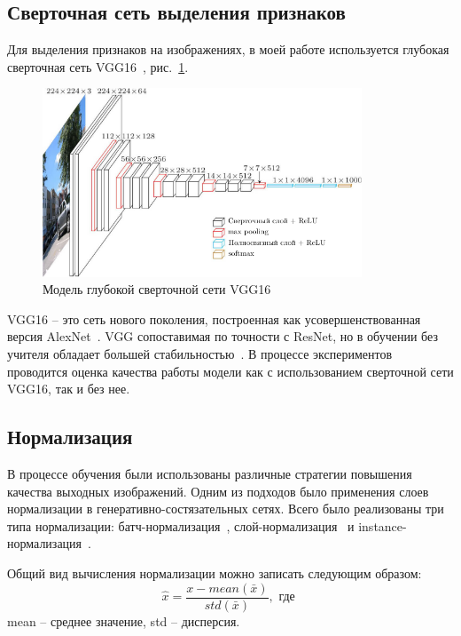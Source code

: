 \documentclass[11pt,a4paper]{extarticle}
\begin{document}
{	\subsection{Сверточная сеть выделения признаков}\label{sec:model:vgg}
			
		Для выделения признаков на изображениях, в моей работе используется глубокая сверточная сеть VGG16~\cite{vgg}, рис.~\ref{pic:vgg16}.

		\begin{figure}[ht]
			\centering
			\includegraphics[width=0.85\textwidth]{img/vgg16}
			\caption{Модель глубокой сверточной сети VGG16}
			\label{pic:vgg16}
		\end{figure}
		
		\noindent 
		VGG16 -- это сеть нового поколения, построенная как усовершенствованная версия AlexNet~\cite{AlexNet}. 
		VGG сопоставимая по точности с ResNet, но в обучении без учителя обладает большей стабильностью~\cite{MUNIT}.
		В процессе экспериментов проводится оценка качества работы модели как с использованием сверточной сети VGG16, так и без нее.

	\subsection{Нормализация}\label{sec:model:norm}

		В процессе обучения были использованы различные стратегии повышения качества выходных изображений.
		Одним из подходов было применения слоев нормализации в генеративно-состязательных сетях.
		Всего было реализованы три типа нормализации: батч-нормализация~\cite{n_batch}, слой-нормализация~\cite{n_layer} и instance-нормализация~\cite{n_instance}.

		\noindent
		Общий вид вычисления нормализации можно записать следующим образом:
		\begin{equation}\label{eq:norm}
			\hat{x} = \frac{x - mean(\bar{x})}{std(\bar{x})}, \text{ где }
		\end{equation}
		mean -- среднее значение, std -- дисперсия. 
		
}
\end{document}
